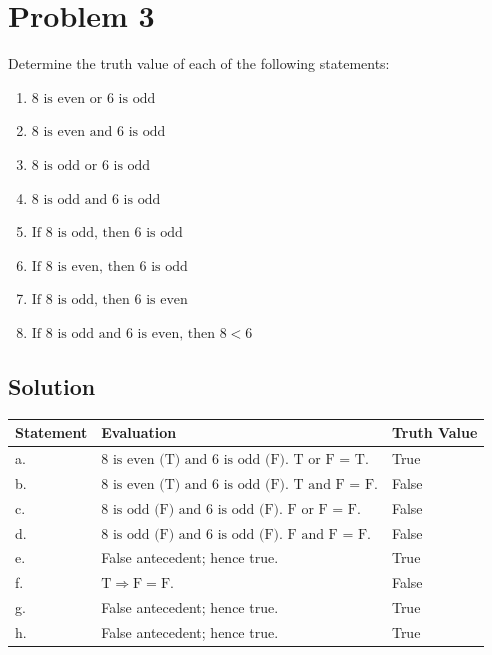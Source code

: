 \documentclass[12pt]{article}
\begin{document}
\newpage
\section*{Problem 3}
Determine the truth value of each of the following statements:
\begin{enumerate}
    \item \( 8 \text{ is even or } 6 \text{ is odd} \)
    \item \( 8 \text{ is even and } 6 \text{ is odd} \)
    \item \( 8 \text{ is odd or } 6 \text{ is odd} \)
    \item \( 8 \text{ is odd and } 6 \text{ is odd} \)
    \item \( \text{If } 8 \text{ is odd, then } 6 \text{ is odd} \)
    \item \( \text{If } 8 \text{ is even, then } 6 \text{ is odd} \)
    \item \( \text{If } 8 \text{ is odd, then } 6 \text{ is even} \)
    \item \( \text{If } 8 \text{ is odd and } 6 \text{ is even, then } 8 < 6 \)
\end{enumerate}
\newpage
\subsection*{Solution}
\begin{small}  %
\begin{tabular}{|p{2cm}|p{8cm}|p{2.2cm}|}  %
\hline
Statement & Evaluation & Truth Value \\  %
\hline
a. & \(8 \text{ is even (T) and } 6 \text{ is odd (F)}. \text{ T or F = T.}\) & True \\
\hline
b. & \(8 \text{ is even (T) and } 6 \text{ is odd (F)}. \text{ T and F = F.}\) & False \\
\hline
c. & \(8 \text{ is odd (F) and } 6 \text{ is odd (F)}. \text{ F or F = F.}\) & False \\
\hline
d. & \(8 \text{ is odd (F) and } 6 \text{ is odd (F)}. \text{ F and F = F.}\) & False \\
\hline
e. & False antecedent; hence true. & True \\
\hline
f. & \( \text{T} \Rightarrow \text{F} = \text{F}.\) & False \\
\hline
g. & False antecedent; hence true. & True \\
\hline
h. & False antecedent; hence true. & True \\
\hline
\end{tabular}
\end{small}
\end{document}
